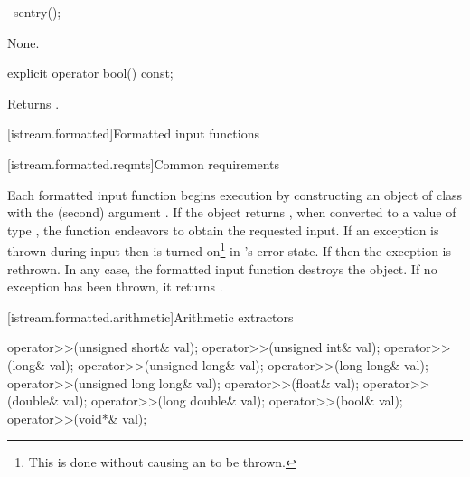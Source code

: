 %
%
\begin{itemdecl}
~sentry();
\end{itemdecl}

\begin{itemdescr}
\pnum
\effects
None.
\end{itemdescr}

%
\begin{itemdecl}
explicit operator bool() const;
\end{itemdecl}

\begin{itemdescr}
\pnum
\effects
Returns
.
\end{itemdescr}

[istream.formatted]{Formatted input functions}

[istream.formatted.reqmts]{Common requirements}

\pnum
Each formatted input function begins execution by constructing an object of class
with the
(second) argument
.
If the
object returns
,
when converted to a value of type
,
the function endeavors
to obtain the requested input.
If an exception is thrown during input then
is turned on\footnote{This is done without causing an
to be thrown.}
in
's
error state.
If
then the exception is rethrown.
In any case, the formatted input function destroys the
object.
If no exception has been thrown, it returns
.

[istream.formatted.arithmetic]{Arithmetic extractors}

%
\begin{itemdecl}
operator>>(unsigned short& val);
operator>>(unsigned int& val);
operator>>(long& val);
operator>>(unsigned long& val);
operator>>(long long& val);
operator>>(unsigned long long& val);
operator>>(float& val);
operator>>(double& val);
operator>>(long double& val);
operator>>(bool& val);
operator>>(void*& val);
\end{itemdecl}


